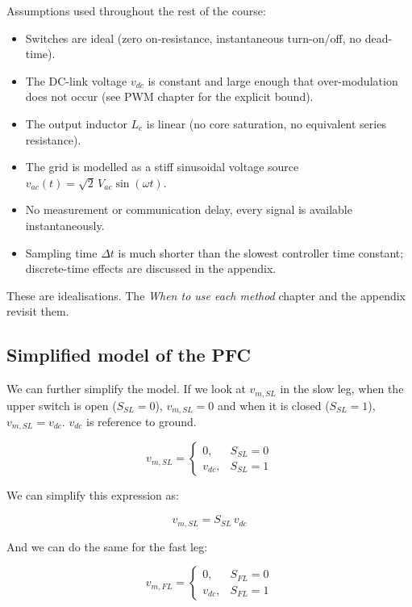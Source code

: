 \documentclass[11pt]{article}
\providecommand{\tightlist}{%
      \setlength{\itemsep}{0pt}\setlength{\parskip}{0pt}}
\begin{document}
Assumptions used throughout the rest of the course:

\begin{itemize}
\tightlist
\item
  Switches are ideal (zero on-resistance, instantaneous turn-on/off, no
  dead-time).
\item
  The DC-link voltage \(v_{dc}\) is constant and large enough that
  over-modulation does not occur (see PWM chapter for the explicit
  bound).
\item
  The output inductor \(L_c\) is linear (no core saturation, no
  equivalent series resistance).
\item
  The grid is modelled as a stiff sinusoidal voltage source
  \(v_{ac}(t) = \sqrt{2}\, V_{ac}\sin(\omega t)\).
\item
  No measurement or communication delay, every signal is available
  instantaneously.
\item
  Sampling time \(\Delta t\) is much shorter than the slowest controller
  time constant; discrete-time effects are discussed in the appendix.
\end{itemize}

These are idealisations. The \emph{When to use each method} chapter and
the appendix revisit them.

    \hypertarget{simplified-model-of-the-pfc}{%
\subsection{Simplified model of the
PFC}\label{simplified-model-of-the-pfc}}

    We can further simplify the model. If we look at \(v_{m,SL}\) in the
slow leg, when the upper switch is open (\(S_{SL}=0\)), \(v_{m,SL} = 0\)
and when it is closed (\(S_{SL}=1\)), \(v_{m,SL} = v_{dc}\). \(v_{dc}\)
is reference to ground.

\[
v_{m,SL} =
\begin{cases}
0, & S_{SL}=0 \\
v_{dc}, & S_{SL}=1
\end{cases}
\]

We can simplify this expression as:

\[
v_{m,SL} = S_{SL} \, v_{dc}
\]

And we can do the same for the fast leg:

\[
v_{m,FL} =
\begin{cases}
0, & S_{FL}=0 \\
v_{dc}, & S_{FL}=1
\end{cases}
\]
\end{document}
